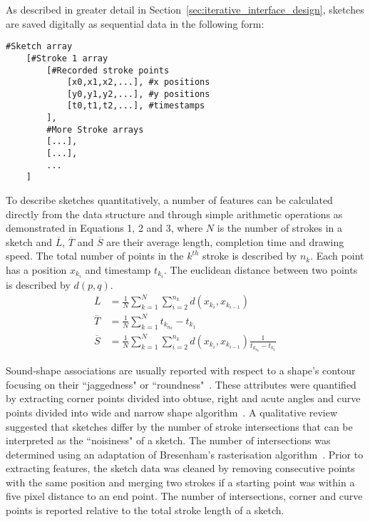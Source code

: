 \documentclass[]{interact}
\theoremstyle{plain}%
\theoremstyle{definition}
\theoremstyle{remark}
\begin{document}
As described in greater detail in Section~\ref{sec:iterative_interface_design}, sketches are saved digitally as sequential data in the following form: 

\begin{lstlisting}[caption=Structure of sketch data]
#Sketch array
    [#Stroke 1 array
        [#Recorded stroke points
            [x0,x1,x2,...], #x positions
            [y0,y1,y2,...], #y positions
            [t0,t1,t2,...], #timestamps
        ],
        #More Stroke arrays
        [...],
        [...],
        ...
    ]
\end{lstlisting}

To describe sketches quantitatively, a number of features can be calculated directly from the data structure and through simple arithmetic operations as demonstrated in Equations 1, 2 and 3, where \textit{$N$} is the number of strokes in a sketch and \textit{$\overline{L}$}, \textit{$\overline{T}$} and $\overline{S}$ are their average length, completion time and drawing speed. The total number of points in the \textit{$k^{th}$} stroke is described by \textit{$n_k$}. Each point has a position \textit{$x_{k_i}$} and timestamp  \textit{$t_{k_i}$}. The euclidean distance between two points is described by $d(p, q)$. 
\begin{align}
    \overline{L} & = \frac{1}{N} \sum_{k=1}^{N} \sum_{i=2}^{n_k} d\left(x_{k_{i}}, x_{k_{i-1}} \right)    
    \\
    \overline{T} & = \frac{1}{N} \sum_{k=1}^{N} t_{k_{n_k}} - t_{k_1}
    \\
    \overline{S} & = \frac{1}{N} \sum_{k=1}^{N} \sum_{i=2}^{n_k} d\left(x_{k_{i}}, x_{k_{i-1}} \right) \frac{1}{t_{k_{n_k}} - t_{k_1}}
\end{align}

Sound-shape associations are usually reported with respect to a shape's contour focusing on their ``jaggedness" or ``roundness"~\cite{adeliAudiovisualCorrespondenceMusical2014,grillVisualizationPerceptualQualities2012}. These attributes were quantified by extracting corner points divided into obtuse, right and acute angles and curve points divided into wide and narrow shape algorithm~\cite{wolinShortStrawSimpleEffective,xiongRevisitingShortStrawImproving2009}. A qualitative review suggested that sketches differ by the number of stroke intersections that can be interpreted as the ``noisiness" of a sketch. The number of intersections was determined using an adaptation of Bresenham's rasterisation algorithm~\cite{bresenham1965algorithm}. Prior to extracting features, the sketch data was cleaned by removing consecutive points with the same position and merging two strokes if a starting point was within a five pixel distance to an end point. The number of intersections, corner and curve points is reported relative to the total stroke length of a sketch.
\end{document}
